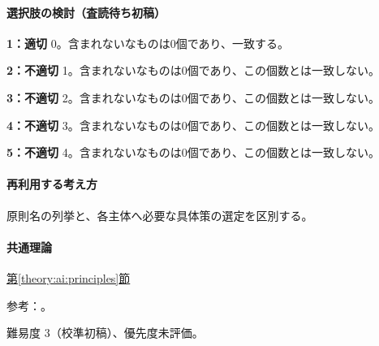 \paragraph{選択肢の検討（査読待ち初稿）}\mbox{}\par

\noindent\textbf{1：適切} 0。含まれないなものは0個であり、一致する。\par

\noindent\textbf{2：不適切} 1。含まれないなものは0個であり、この個数とは一致しない。\par

\noindent\textbf{3：不適切} 2。含まれないなものは0個であり、この個数とは一致しない。\par

\noindent\textbf{4：不適切} 3。含まれないなものは0個であり、この個数とは一致しない。\par

\noindent\textbf{5：不適切} 4。含まれないなものは0個であり、この個数とは一致しない。\par

\paragraph{再利用する考え方} 原則名の列挙と、各主体へ必要な具体策の選定を区別する。

\paragraph{共通理論} \hyperref[theory:ai:principles]{第\ref*{theory:ai:principles}節}

\par 参考：\cite{ai_use2019}。

\par 難易度 3（校準初稿）、優先度未評価。
